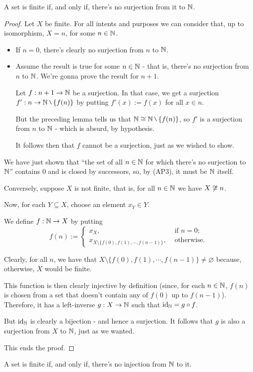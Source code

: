 \begin{prop}
	A set is finite if, and only if, there's no surjection from it to $\mathbb N$.
\end{prop}
\begin{proof}
	Let $X$ be finite. For all intents and purposes we can consider that, up to isomorphism, $X=n$, for some $n\in \mathbb N$.
	
	\begin{itemize}
		\item If $n=0$, there's clearly no surjection from $n$ to $\mathbb N$.
		\item Assume the result is true for some $n\in \mathbb N$ - that is, there's no surjection from $n$ to $\mathbb N$. We're gonna prove the result for $n+1$.
		
		Let $f:n+1\to \mathbb N$ be a surjection. In that case, we get a surjection $f':n\to \N\setminus\{f(n)\}$ by putting $f'(x):=f(x)$ for all $x\in n$.
		
		But the preceding lemma tells us that $\N\iso \N\setminus\{f(n)\}$, so $f'$ is a surjection from $n$ to $\mathbb N$ - which is absurd, by hypothesis.
		
		It follows then that $f$ cannot be a surjection, just as we wished to show.
	\end{itemize}

We have just shown that ``the set of all $n\in \mathbb N$ for which there's no surjection to $\mathbb N$'' contains 0 and is closed by successors, so, by (AP3), it must be $\mathbb N$ itself.

\bigskip
Conversely, suppose $X$ is not finite, that is, for all $n\in\mathbb N$ we have $X\not\cong n$.

Now, for each $Y\subseteq X$, choose an element $x_Y\in Y$.

We define $f:\mathbb N\to X$ by putting
\[f(n):=\begin{cases}
x_X,&\mbox{ if }n=0;\\
x_{X\setminus\{f(0),f(1),\cdots,f(n-1)\}},&\mbox{ otherwise.}
\end{cases}\]

Clearly, for all $n$, we have that $X\setminus\{f(0),f(1),\cdots,f(n-1)\}\neq\varnothing$ because, otherwise, $X$ would be finite.

This function is then clearly injective by definition (since, for each $n\in \mathbb N$, $f(n)$ is chosen from a set that doesn't contain any of $f(0)$ up to $f(n-1)$). Therefore, it has a left-inverse $g:X\to\mathbb N$ such that ${\rm id}_{\mathbb N}=g\circ f$.

But ${\rm id}_{\mathbb N}$ is clearly a bijection - and hence a surjection. It follows that $g$ is also a surjection from $X$ to $\mathbb N$, just as we wanted.

\bigskip
This ends the proof.
\end{proof}
\begin{cor}
	A set is finite if, and only if, there's no injection from $\mathbb N$ to it.
\end{cor}

